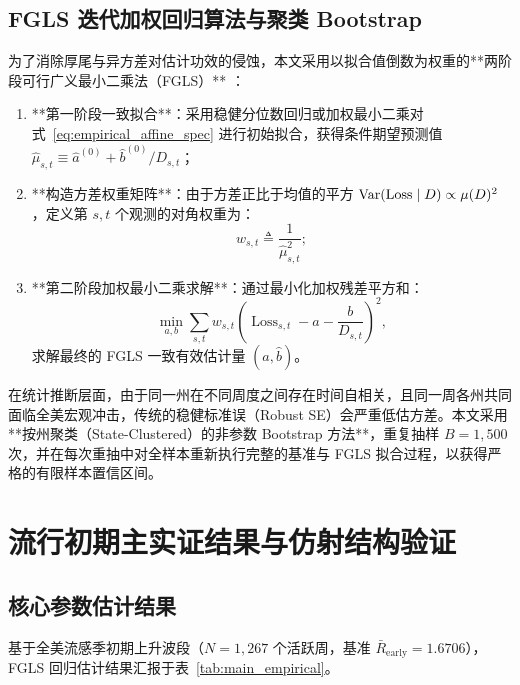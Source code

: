 \subsection{FGLS 迭代加权回归算法与聚类 Bootstrap}
为了消除厚尾与异方差对估计功效的侵蚀，本文采用以拟合值倒数为权重的**两阶段可行广义最小二乘法（FGLS）** \citep{wooldridge2010econometric,cameron2005microeconometrics}：
\begin{enumerate}[label=\textbf{步骤 \arabic*.}]
    \item **第一阶段一致拟合**：采用稳健分位数回归或加权最小二乘对式~\eqref{eq:empirical_affine_spec} 进行初始拟合，获得条件期望预测值 $\widehat{\mu}_{s,t} \equiv \widehat{a}^{(0)} + \widehat{b}^{(0)} / D_{s,t}$；
    \item **构造方差权重矩阵**：由于方差正比于均值的平方 $\operatorname{Var}(\operatorname{Loss} \mid D) \propto \mu(D)^2$，定义第 $s,t$ 个观测的对角权重为：
    \begin{equation}
    w_{s,t} \triangleq \frac{1}{\widehat{\mu}_{s,t}^2};
    \end{equation}
    \item **第二阶段加权最小二乘求解**：通过最小化加权残差平方和：
    \begin{equation}
    \min_{a, b} \sum_{s,t} w_{s,t} \left( \operatorname{Loss}_{s,t} - a - \frac{b}{D_{s,t}} \right)^2,
    \end{equation}
    求解最终的 FGLS 一致有效估计量 $(\hat{a}, \hat{b})$。
\end{enumerate}

在统计推断层面，由于同一州在不同周度之间存在时间自相关，且同一周各州共同面临全美宏观冲击，传统的稳健标准误（Robust SE）会严重低估方差。本文采用**按州聚类（State-Clustered）的非参数 Bootstrap 方法**，重复抽样 $B = 1{,}500$ 次，并在每次重抽中对全样本重新执行完整的基准与 FGLS 拟合过程，以获得严格的有限样本置信区间。

\section{流行初期主实证结果与仿射结构验证}\label{sec:early_results}

\subsection{核心参数估计结果}
基于全美流感季初期上升波段（$N = 1{,}267$ 个活跃周，基准 $\bar{R}_{\text{early}} = 1.6706$），FGLS 回归估计结果汇报于表~\ref{tab:main_empirical}。

